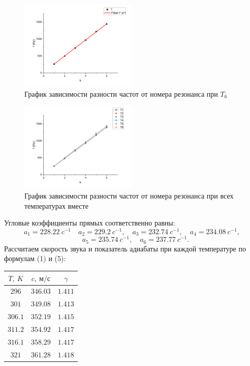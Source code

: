 \documentclass[a4paper, 12pt]{article}%
\begin{document}
\begin{figure}
\begin{center}
\includegraphics[width = 0.5\textwidth]{labphoto22.png}
\caption{График зависимости разности частот от номера резонанса при $T_6$}
\end{center}
\end{figure}

\begin{figure}
\begin{center}
\includegraphics[width = 0.5\textwidth]{labphoto23.png}
\caption{График зависимости разности частот от номера резонанса при всех температурах вместе}
\end{center}
\end{figure}
\newpage
Угловые коэффициенты прямых соответственно равны:
\[
	a_1 = 228.22\ c^{-1} \quad a_2 = 229.2\ c^{-1}, \quad a_3 = 232.74\ c^{-1}, \quad a_4 = 234.08\ c^{-1}, 
\]
\[	
	\quad a_5 = 235.74\ c^{-1}, \quad a_6 = 237.77\ c^{-1}.
\]
Рассчитаем скорость звука и показатель адиабаты при каждой температуре по формулам (1) и (5):
\\
\begin{center}
\begin{tabular}{|c|c|c|}
\hline $T,\ K$ & $c,\ \text{м/с}$ & $\gamma$ \\\hline
$296$ & $346.03$ & $1.411$ \\\hline
$301$ & $349.08$ & $1.413$ \\\hline
$306.1$ & $352.19$ & $1.415$ \\\hline
$311.2$ & $354.92$ & $1.417$ \\\hline
$316.1$ & $358.29$ & $1.417$ \\\hline
$321$ & $361.28$ & $1.418$ \\\hline
\end{tabular}
\end{center}
\end{document}
